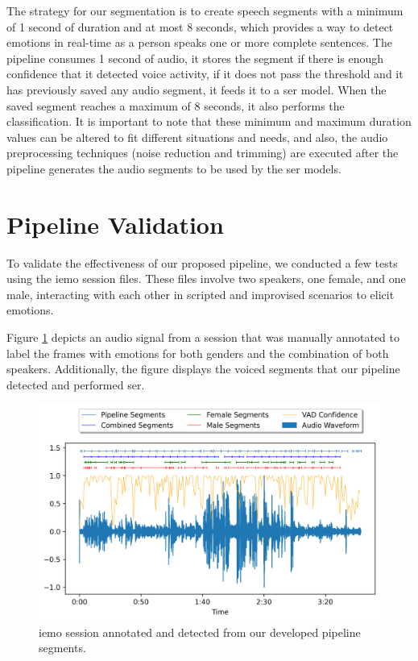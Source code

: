 The strategy for our segmentation is to create speech segments with a minimum of 1 second of duration and at most 8 seconds, which provides a way to detect emotions in real-time as a person speaks one or more complete sentences. The pipeline consumes 1 second of audio, it stores the segment if there is enough confidence that it detected voice activity, if it does not pass the threshold and it has previously saved any audio segment, it feeds it to a \ac{ser} model. When the saved segment reaches a maximum of 8 seconds, it also performs the classification. It is important to note that these minimum and maximum duration values can be altered to fit different situations and needs, and also, the audio preprocessing techniques (noise reduction and trimming) are executed after the pipeline generates the audio segments to be used by the \ac{ser} models.


\section{Pipeline Validation}

To validate the effectiveness of our proposed pipeline, we conducted a few tests using the \ac{iemo} session files. These files involve two speakers, one female, and one male, interacting with each other in scripted and improvised scenarios to elicit emotions.

Figure \ref{fig:iemo_pipeline} depicts an audio signal from a session that was manually annotated to label the frames with emotions for both genders and the combination of both speakers. Additionally, the figure displays the voiced segments that our pipeline detected and performed \ac{ser}.

\begin{figure}[H]
	\centering
	\includegraphics[width=\textwidth]{figs/6_video_conf_ser/pipeline.png}
	\caption{\ac{iemo} session annotated and detected from our developed pipeline segments.}
	\label{fig:iemo_pipeline}
\end{figure}

